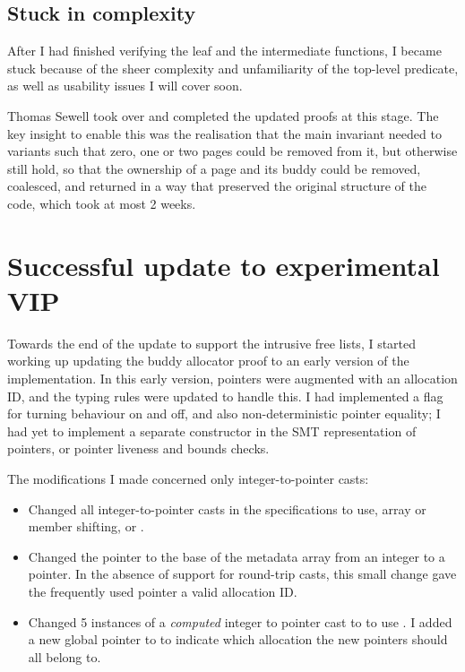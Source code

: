 \subsection{Stuck in complexity}

After I had finished verifying the leaf and the intermediate functions, I
became stuck because of the sheer complexity and unfamiliarity of the top-level
predicate, as well as usability issues I will cover soon.

Thomas Sewell took over and completed the updated proofs at this stage. The key
insight to enable this was the realisation that the main invariant needed to
variants such that zero, one or two pages could be removed from it, but
otherwise still hold, so that the ownership of a page and its buddy could be
removed, coalesced, and returned in a way that preserved the original structure
of the code, which took at most 2 weeks.

\section{Successful update to experimental VIP}

Towards the end of the update to support the intrusive free lists, I started
working up updating the buddy allocator proof to an early version of the
 implementation. In this early version, pointers were augmented with an
allocation ID, and the typing rules were updated to handle this. I had
implemented a flag for turning  behaviour on and off, and also
non-deterministic pointer equality; I had yet to implement a separate
 constructor in the SMT representation of pointers, or pointer
liveness and bounds checks.

The modifications I made concerned only integer-to-pointer casts:
\begin{itemize}
    \item Changed all integer-to-pointer casts in the specifications to use,
        array or member shifting, or .
    \item Changed the pointer to the base of the metadata array from an integer
        to a pointer.
        In the absence of support for round-trip casts, this small change gave
        the frequently used pointer a valid allocation ID\@.
    \item Changed 5 instances of a \emph{computed} integer to pointer cast to
        to use . I added a new global pointer to
        to indicate which allocation the new pointers should all belong to.
\end{itemize}

